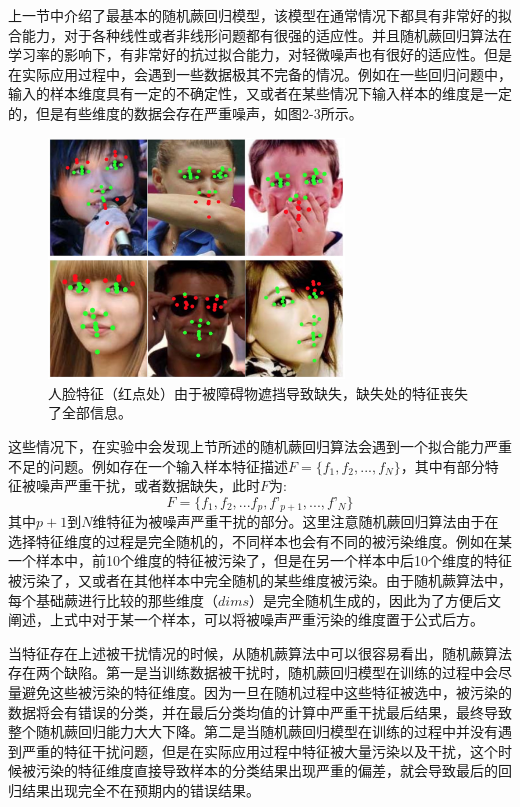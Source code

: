 上一节中介绍了最基本的随机蕨回归模型，该模型在通常情况下都具有非常好的拟合能力，对于各种线性或者非线形问题都有很强的适应性。并且随机蕨回归算法在学习率的影响下，有非常好的抗过拟合能力，对轻微噪声也有很好的适应性。但是在实际应用过程中，会遇到一些数据极其不完备的情况。例如在一些回归问题中，输入的样本维度具有一定的不确定性，又或者在某些情况下输入样本的维度是一定的，但是有些维度的数据会存在严重噪声，如图2-3所示。

\begin{figure}[htb]
	\centering 
	\includegraphics[width=0.7\textwidth]{./mypic/人脸特征由于被遮挡导致的缺失.jpg} 
	\caption{人脸特征（红点处）由于被障碍物遮挡导致缺失，缺失处的特征丧失了全部信息。} 
\end{figure}

这些情况下，在实验中会发现上节所述的随机蕨回归算法会遇到一个拟合能力严重不足的问题。例如存在一个输入样本特征描述$F=\{f_1,f_2,...,f_N\}$，其中有部分特征被噪声严重干扰，或者数据缺失，此时$F$为:
\begin{equation}
F=\{f_1,f_2,...f_p,f’_{p+1},...,f’_N\}
\end{equation}
其中$p+1$到$N$维特征为被噪声严重干扰的部分。这里注意随机蕨回归算法由于在选择特征维度的过程是完全随机的，不同样本也会有不同的被污染维度。例如在某一个样本中，前10个维度的特征被污染了，但是在另一个样本中后10个维度的特征被污染了，又或者在其他样本中完全随机的某些维度被污染。由于随机蕨算法中，每个基础蕨进行比较的那些维度（$dims$）是完全随机生成的，因此为了方便后文阐述，上式中对于某一个样本，可以将被噪声严重污染的维度置于公式后方。

当特征存在上述被干扰情况的时候，从随机蕨算法中可以很容易看出，随机蕨算法存在两个缺陷。第一是当训练数据被干扰时，随机蕨回归模型在训练的过程中会尽量避免这些被污染的特征维度。因为一旦在随机过程中这些特征被选中，被污染的数据将会有错误的分类，并在最后分类均值的计算中严重干扰最后结果，最终导致整个随机蕨回归能力大大下降。第二是当随机蕨回归模型在训练的过程中并没有遇到严重的特征干扰问题，但是在实际应用过程中特征被大量污染以及干扰，这个时候被污染的特征维度直接导致样本的分类结果出现严重的偏差，就会导致最后的回归结果出现完全不在预期内的错误结果。

